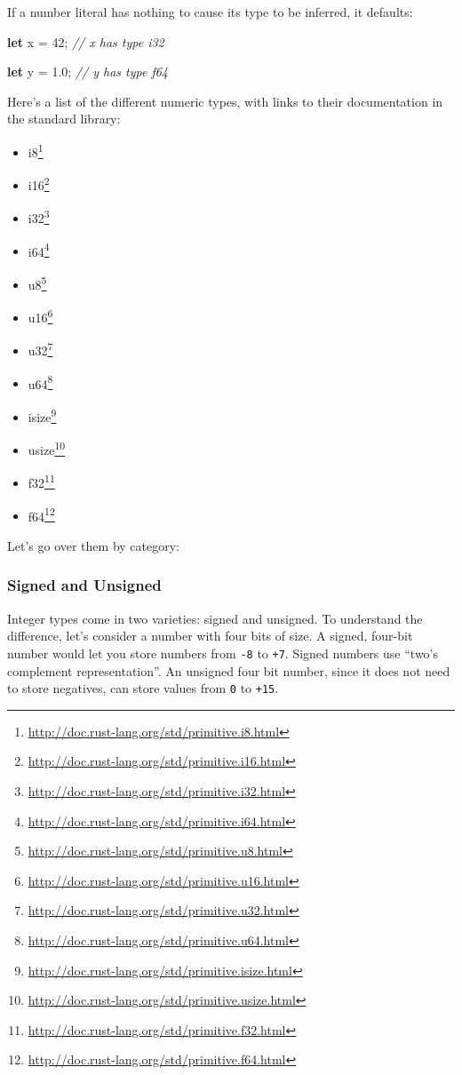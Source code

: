 \documentclass[a4paper,]{book}
\newenvironment{Shaded}{\begin{snugshade}}{\end{snugshade}}
\newcommand{\KeywordTok}[1]{\textcolor[rgb]{0.13,0.29,0.53}{\textbf{{#1}}}}
\newcommand{\DecValTok}[1]{\textcolor[rgb]{0.00,0.00,0.81}{{#1}}}
\newcommand{\CommentTok}[1]{\textcolor[rgb]{0.56,0.35,0.01}{\textit{{#1}}}}
\newcommand{\NormalTok}[1]{{#1}}
\renewcommand{\href}[2]{#2\footnote{\url{#1}}}
\begin{document}
If a number literal has nothing to cause its type to be inferred, it
defaults:

\begin{Shaded}
\begin{Highlighting}[]
\KeywordTok{let} \NormalTok{x = }\DecValTok{42}\NormalTok{; }\CommentTok{// x has type i32}

\KeywordTok{let} \NormalTok{y = }\DecValTok{1.0}\NormalTok{; }\CommentTok{// y has type f64}
\end{Highlighting}
\end{Shaded}

Here's a list of the different numeric types, with links to their
documentation in the standard library:

\begin{itemize}
\itemsep1pt\parskip0pt
\item
  \href{http://doc.rust-lang.org/std/primitive.i8.html}{i8}
\item
  \href{http://doc.rust-lang.org/std/primitive.i16.html}{i16}
\item
  \href{http://doc.rust-lang.org/std/primitive.i32.html}{i32}
\item
  \href{http://doc.rust-lang.org/std/primitive.i64.html}{i64}
\item
  \href{http://doc.rust-lang.org/std/primitive.u8.html}{u8}
\item
  \href{http://doc.rust-lang.org/std/primitive.u16.html}{u16}
\item
  \href{http://doc.rust-lang.org/std/primitive.u32.html}{u32}
\item
  \href{http://doc.rust-lang.org/std/primitive.u64.html}{u64}
\item
  \href{http://doc.rust-lang.org/std/primitive.isize.html}{isize}
\item
  \href{http://doc.rust-lang.org/std/primitive.usize.html}{usize}
\item
  \href{http://doc.rust-lang.org/std/primitive.f32.html}{f32}
\item
  \href{http://doc.rust-lang.org/std/primitive.f64.html}{f64}
\end{itemize}

Let's go over them by category:

\subsubsection{Signed and Unsigned}\label{signed-and-unsigned}

Integer types come in two varieties: signed and unsigned. To understand
the difference, let's consider a number with four bits of size. A
signed, four-bit number would let you store numbers from \texttt{-8} to
\texttt{+7}. Signed numbers use ``two's complement representation''. An
unsigned four bit number, since it does not need to store negatives, can
store values from \texttt{0} to \texttt{+15}.
\end{document}
